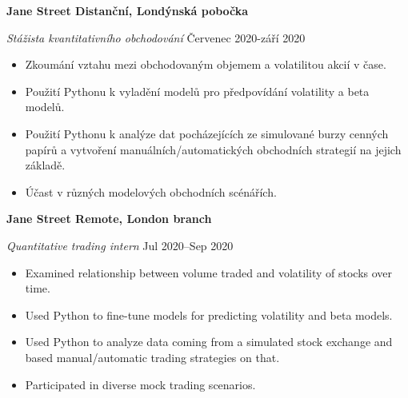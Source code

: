 \ifczech

\textbf{Jane Street \hfill Distanční, Londýnská pobočka} \par
\textit{Stážista kvantitativního obchodování} \hfill Červenec 2020-září 2020 \par
\begin{itemize}
	\item Zkoumání vztahu mezi obchodovaným objemem a volatilitou akcií v čase.
\item Použití Pythonu k vyladění modelů pro předpovídání volatility a beta modelů.
\item Použití Pythonu k analýze dat pocházejících ze simulované burzy cenných papírů a vytvoření manuálních/automatických obchodních strategií na jejich základě.
\item Účast v různých modelových obchodních scénářích.
\end{itemize} \par

\else

\textbf{Jane Street \hfill  Remote, London branch} \par
\textit{Quantitative trading intern} \hfill Jul 2020--Sep 2020 \par
\begin{itemize}
	\item Examined relationship between volume traded and volatility of stocks over time.
	\item Used Python to fine-tune models for predicting volatility and beta models.
	\item Used Python to analyze data coming from a simulated stock exchange and based manual/automatic trading strategies on that.
	\item Participated in diverse mock trading scenarios.
\end{itemize} \par

\fi